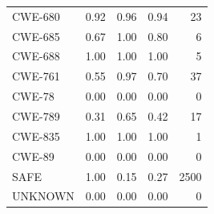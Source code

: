 \documentclass[12pt, a4paper, twoside]{article}
\begin{document}
\begin{longtable}{lrrrr}
	CWE-680 & 0.92 & 0.96 & 0.94 & 23 \\
	CWE-685 & 0.67 & 1.00 & 0.80 & 6 \\
	CWE-688 & 1.00 & 1.00 & 1.00 & 5 \\
	CWE-761 & 0.55 & 0.97 & 0.70 & 37 \\
	CWE-78  & 0.00 & 0.00 & 0.00 & 0 \\
	CWE-789 & 0.31 & 0.65 & 0.42 & 17 \\
	CWE-835 & 1.00 & 1.00 & 1.00 & 1 \\
	CWE-89  & 0.00 & 0.00 & 0.00 & 0 \\
	SAFE    & 1.00 & 0.15 & 0.27 & 2500 \\
	UNKNOWN & 0.00 & 0.00 & 0.00 & 0 \\
\end{longtable}
\end{document}
